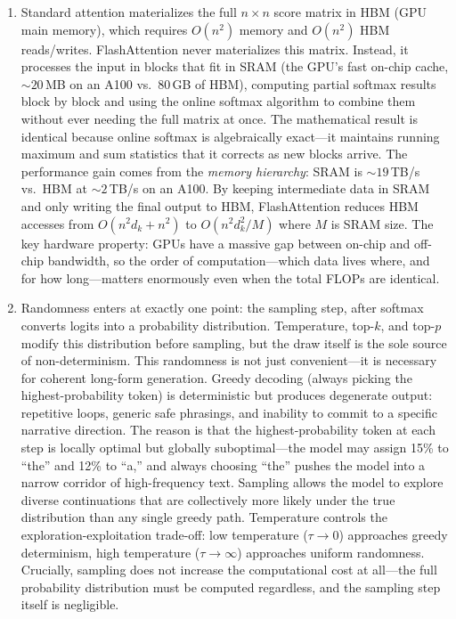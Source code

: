 \begin{enumerate}
    \item Standard attention materializes the full $n \times n$ score matrix in HBM (GPU main memory), which requires $O(n^2)$ memory and $O(n^2)$ HBM reads/writes. FlashAttention never materializes this matrix. Instead, it processes the input in blocks that fit in SRAM (the GPU's fast on-chip cache, ${\sim}20$\,MB on an A100 vs.\ 80\,GB of HBM), computing partial softmax results block by block and using the online softmax algorithm to combine them without ever needing the full matrix at once. The mathematical result is identical because online softmax is algebraically exact---it maintains running maximum and sum statistics that it corrects as new blocks arrive. The performance gain comes from the \emph{memory hierarchy}: SRAM is ${\sim}19$\,TB/s vs.\ HBM at ${\sim}2$\,TB/s on an A100. By keeping intermediate data in SRAM and only writing the final output to HBM, FlashAttention reduces HBM accesses from $O(n^2 d_k + n^2)$ to $O(n^2 d_k^2 / M)$ where $M$ is SRAM size. The key hardware property: GPUs have a massive gap between on-chip and off-chip bandwidth, so the order of computation---which data lives where, and for how long---matters enormously even when the total FLOPs are identical.

    \item Randomness enters at exactly one point: the sampling step, after softmax converts logits into a probability distribution. Temperature, top-$k$, and top-$p$ modify this distribution before sampling, but the draw itself is the sole source of non-determinism. This randomness is not just convenient---it is necessary for coherent long-form generation. Greedy decoding (always picking the highest-probability token) is deterministic but produces degenerate output: repetitive loops, generic safe phrasings, and inability to commit to a specific narrative direction. The reason is that the highest-probability token at each step is locally optimal but globally suboptimal---the model may assign 15\% to ``the'' and 12\% to ``a,'' and always choosing ``the'' pushes the model into a narrow corridor of high-frequency text. Sampling allows the model to explore diverse continuations that are collectively more likely under the true distribution than any single greedy path. Temperature controls the exploration-exploitation trade-off: low temperature ($\tau \to 0$) approaches greedy determinism, high temperature ($\tau \to \infty$) approaches uniform randomness. Crucially, sampling does not increase the computational cost at all---the full probability distribution must be computed regardless, and the sampling step itself is negligible.
\end{enumerate}
